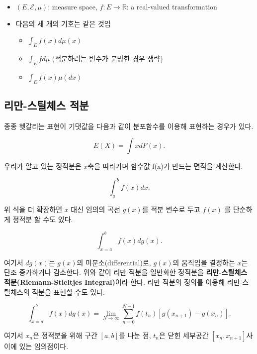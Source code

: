 \documentclass[
  13pt,
  letterpaper,
  DIV=11,
  numbers=noendperiod]{scrreprt}
\providecommand{\tightlist}{%
  \setlength{\itemsep}{0pt}\setlength{\parskip}{0pt}}\usepackage{longtable,booktabs,array}
\theoremstyle{plain}
\theoremstyle{definition}
\theoremstyle{definition}
\theoremstyle{plain}
\theoremstyle{definition}
\theoremstyle{plain}
\theoremstyle{remark}
\begin{document}
\begin{itemize}
\item
  \((E,\mathcal{E},\mu)\): measure space,
  \(f: E \rightarrow\mathbb{R}\): a real-valued transformation
\item
  다음의 세 개의 기호는 같은 것임

  \begin{itemize}
  \tightlist
  \item
    \(\int_E f(x) d\mu (x)\)
  \item
    \(\int_E f d\mu\) (적분하려는 변수가 분명한 경우 생략)
  \item
    \(\int_E f(x) \mu (dx)\)
  \end{itemize}
\end{itemize}

\subsection{리만-스틸체스
적분}\label{uxb9acuxb9cc-uxc2a4uxd2f8uxccb4uxc2a4-uxc801uxbd84}

종종 헷갈리는 표현이 기댓값을 다음과 같이 분포함수를 이용해 표현하는
경우가 있다.

\[
E(X) = \int x dF(x).
\]

우리가 알고 있는 정적분은 \(x\)축을 따라가며 함수값 f(x)가 만드는 면적을
계산한다.

\[
\int_a^b f(x) dx.
\]

위 식을 더 확장하면 \(x\) 대신 임의의 곡선 \(g(x)\)를 적분 변수로 두고
\(f(x)\) 를 단순하게 정적분 할 수도 있다.

\[
\int_{x=a}^b f(x) dg(x).
\]

여기서 \(dg(x)\)는 \(g(x)\)의 미분소(differential)로, \(g(x)\)의
움직임을 결정하는 \(x\)는 단조 증가하거나 감소한다. 위와 같이 리만
적분을 일반화한 정적분을 \textbf{리만-스틸체스 적분(Riemann-Stieltjes
Integral)}이라 한다. 리만 적분의 정의를 이용해 리만-스틸체스의 적분을
표현할 수도 있다.

\[
\int_{x=a}^b f(x) dg(x) = \lim_{N\rightarrow \infty} \sum_{n=0}^{N-1} f(t_n) [g(x_{n+1}) - g(x_n)].
\]

여기서 \(x_n\)은 정적분을 위해 구간 \([a,b]\)를 나눈 점, \(t_n\)은 닫힌
세부공간 \([x_n, x_{n+1} ]\)사이에 있는 임의점이다.
\end{document}
